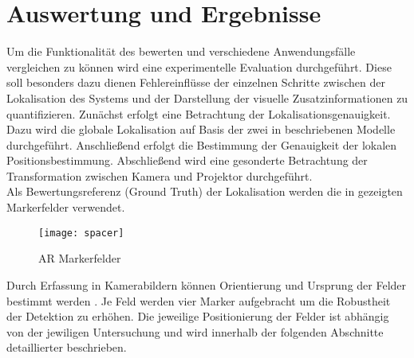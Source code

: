 \chapter{Auswertung und Ergebnisse}
Um die Funktionalität des  bewerten und verschiedene Anwendungsfälle vergleichen zu können wird eine experimentelle Evaluation durchgeführt. Diese soll besonders dazu dienen Fehlereinflüsse der einzelnen Schritte zwischen der Lokalisation des Systems und der Darstellung der visuelle Zusatzinformationen zu quantifizieren. Zunächst erfolgt eine Betrachtung der Lokalisationsgenauigkeit. Dazu wird die globale Lokalisation auf Basis der zwei in  beschriebenen Modelle durchgeführt. Anschließend erfolgt die Bestimmung der Genauigkeit der lokalen Positionsbestimmung. Abschließend wird eine gesonderte Betrachtung der Transformation zwischen Kamera und Projektor durchgeführt.\\
Als Bewertungsreferenz (Ground Truth) der Lokalisation werden die in  gezeigten Markerfelder verwendet.

\begin{figure}[!ht]
	\begin{center}
		\texttt{[image: spacer]}
		\caption{AR Markerfelder}
		\label{fig.armarker}
	\end{center}
\end{figure}

Durch Erfassung in Kamerabildern können Orientierung und Ursprung der Felder bestimmt werden . Je Feld werden vier Marker aufgebracht um die Robustheit der Detektion zu erhöhen. Die jeweilige Positionierung der Felder ist abhängig von der jewiligen Untersuchung und wird innerhalb der folgenden Abschnitte detaillierter beschrieben. 

